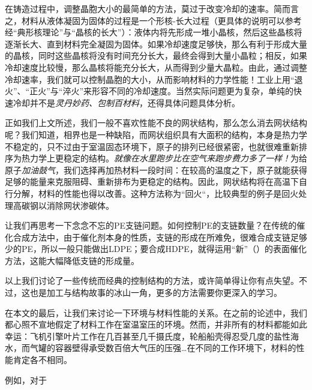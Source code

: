 在铸造过程中，调整晶胞大小的最简单的方法，莫过于改变冷却的速率。简而言之，材料从液体凝固为固体的过程是一个形核-长大过程（更具体的说明可以参考经“典形核理论”与“晶核的长大”）：液体内将先形成一堆小晶核，然后这些晶核将逐渐长大、直到材料完全凝固为固体。如果冷却速度足够快，那么有利于形成大量的晶核，同时这些晶核将没有时间充分长大，最终会得到大量小晶粒；相反，如果冷却速度比较慢，那么晶核将能充分长大，从而得到少量大晶粒。由此，通过调整冷却速率，我们就可以控制晶胞的大小，从而影响材料的力学性能！工业上用“退火”、“正火”与“淬火”来形容不同的冷却速度。当然实际问题更为复杂，单纯的快速冷却并不是\textsl{灵丹妙药、包制百材料}，还得具体问题具体分析。

正如我们上文所述，我们一般不喜欢性能不良的网状结构，那么怎么消去网状结构呢？我们知道，相界也是一种缺陷，而网状组织具有大面积的结构，本身是热力学不稳定的，只不过由于室温固态环境下，原子的排列已经很紧密，也就很难重新排序为热力学上更稳定的结构。\textsl{就像在水里跑步比在空气来跑步费力多了一样！}为给原子\textsl{加油鼓气}，我们选择再加热材料一段时间：在较高的温度之下，原子就能获得足够的能量来克服阻碍、重新排布为更稳定的结构。因此，网状结构将在高温下自行分解，材料的性能也得以改善。这种方法称为“回火“，比较典型的例子是回火处理高碳钢以消除网状渗碳体。

让我们再思考一下念念不忘的PE支链问题。如何控制PE的支链数量？在传统的催化合成方法中，由于催化剂本身的性质，支链的形成在所难免，很难合成支链足够少的PE，所以一般只能做出LDPE；要合成HDPE，就得运用“新”（）的表面催化方法，这能大幅降低支链的形成量。

以上我们讨论了一些传统而经典的控制结构的方法，或许简单得让你有点失望。不过，这也是加工与结构故事的冰山一角，更多的方法需要你更深入的学习。


在本文的最后，让我们来讨论一下环境与材料性能的关系。在之前的论述中，我们都心照不宣地假定了材料工作在室温室压的环境。然而，并非所有的材料都能如此幸运：飞机引擎叶片工作在几百甚至几千摄氏度，轮船船壳得忍受几度的盐性海水，而气罐的容器壁得承受数百倍大气压的压强…在不同的工作环境下，材料的性能肯定各不相同。

例如，对于

